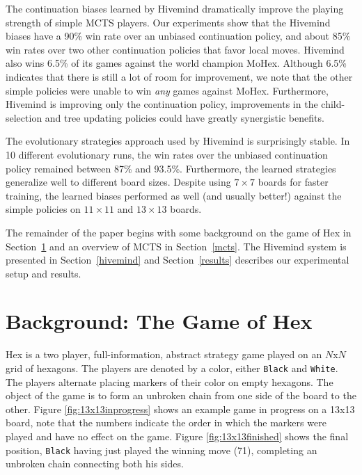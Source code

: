 \documentclass{acm_proc_article-sp}
\newcommand{\black}{\texttt{Black}}
\newcommand{\white}{\texttt{White}}
\begin{document}
The continuation biases learned by Hivemind dramatically improve the playing strength of simple MCTS players.
Our experiments show that the Hivemind biases have a 90\% win rate over an unbiased continuation policy,
and about 85\% win rates over two other continuation policies that favor local moves.  
Hivemind also wins 6.5\% of its games against the world champion MoHex.
Although 6.5\% indicates that there is still a lot of room for improvement, 
we note that the other simple policies were unable to win \emph{any} games against MoHex. 
Furthermore, Hivemind is improving only the continuation policy, 
improvements in the child-selection and tree updating policies could have greatly synergistic benefits.

The evolutionary strategies approach used by Hivemind is surprisingly stable.
In 10 different evolutionary runs, the win rates over the unbiased continuation policy remained
between 87\% and 93.5\%.  
Furthermore, the learned strategies generalize well to different board sizes.
Despite using $7 \times 7$ boards for faster training, 
the learned biases performed as well (and usually better!) against the simple policies on $11 \times 11$ and $13 \times 13$ boards.

The remainder of the paper begins with some background on the game of Hex in Section~\ref{s:hex} and
an overview of MCTS in Section~\ref{mcts}.
The Hivemind system is presented in Section~\ref{hivemind}
and Section~\ref{results} describes our experimental setup and results.




\section{Background: The Game of Hex}
\label{s:hex}
Hex is a two player, full-information, abstract strategy game played on an $N$x$N$ grid of hexagons. The players are denoted by  a color, either \black{} and \white. 
The players alternate placing markers of their color on empty hexagons. 
The object of the game is to form an unbroken chain from one side of the board to the other. 
Figure \ref{fig:13x13inprogress} shows an example game in progress on a 13x13 board, note that the numbers indicate
the order in which the markers were played and have no effect on the game.
Figure \ref{fig:13x13finished} shows the final position, \black{} having just played the winning move (71), completing an unbroken chain connecting both his sides. 
\end{document}
